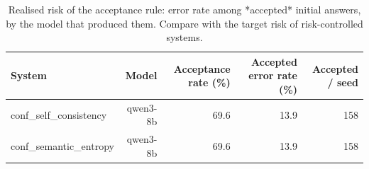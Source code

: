 \begin{table}[t]
\centering
\small
\caption{Realised risk of the acceptance rule: error rate among *accepted* initial answers, by the model that produced them. Compare with the target risk of risk-controlled systems.}
\label{tab:acceptance}
\begin{tabular}{lrrrr}
\toprule
System & Model & Acceptance rate (\%) & Accepted error rate (\%) & Accepted / seed \\
\midrule
conf\_self\_consistency & qwen3-8b & 69.6 & 13.9 & 158 \\
conf\_semantic\_entropy & qwen3-8b & 69.6 & 13.9 & 158 \\
\bottomrule
\end{tabular}
\end{table}
